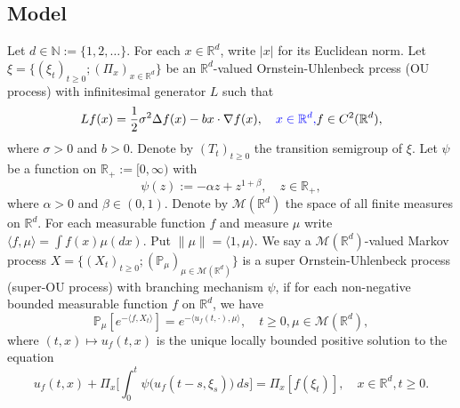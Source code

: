 \documentclass[12pt,oneside,english]{amsart}
\theoremstyle{plain}
\theoremstyle{definition}
\numberwithin{equation}{section}
\newcommand{\added}[1]{{\color{blue}#1}}\newcommand{\deleted}[1]{{\color{red}#1}}
\begin{document}
\subsection{Model}
    Let $d \in \mathbb N:= \{1,2,\dots\}$.
    \deleted{For each $x\in \mathbb{R}^d$, write $|x|$ for its Euclidean norm.}
    Let $\xi=\{(\xi_t)_{t\geq 0}; (\Pi_x)_{x\in \mathbb R^d}\}$ be an $\mathbb R^d$-valued Ornstein-Uhlenbeck prcess (OU process) with infinitesimal generator $L$ such that
\begin{equation}
\label{eq: OU generator}
    Lf(x)
        = \frac{1}{2}\sigma^2\Delta f(x)-b x \cdot \nabla f(x),
        \quad \added{ x\in \mathbb R^d,}
        f \in C^2(\mathbb{R}^d),
\end{equation}
    where $\sigma>0$ and $b>0$.
    Denote by $(T_t)_{t\geq 0}$ the transition semigroup of $\xi$.
    Let $\psi$ be a function on $\mathbb R_+:= [0,\infty)$ with
\begin{equation}\label{mechanism}
    \psi(z)
        := - \alpha z + z^{1+\beta},
        \quad z \in \mathbb R_+,
\end{equation}
        where $\alpha > 0$ and $\beta \in (0,1) $.
    Denote by $\mathcal{M}(\mathbb{R}^d)$ the space of \added{ all} finite measures on $\mathbb{R}^d$.
    For each measurable function $f$ and measure $\mu$ write $\langle f,\mu\rangle = \int f(x)\mu(dx)$.
    Put $\|\mu\|=\langle 1,\mu\rangle$.
    We say a $\mathcal{M}(\mathbb{R}^d)$-valued Markov process $X = \{(X_t)_{t\geq 0}; (\mathbb{P}_{\mu})_{\mu \in \mathcal M(\mathbb R^d)}\}$ is a super Ornstein-Uhlenbeck process (super-OU process) with branching mechanism $\psi$, if for each non-negative bounded measurable function $f$ on $\mathbb{R}^d$, we have
\begin{equation} \label{super}
    \mathbb{P}_{\mu}[e^{-\langle f,X_t \rangle}]
        = e^{-\langle u_f(t,\cdot), \mu \rangle},
        \quad t\geq 0, \mu \in \mathcal M(\mathbb R^d),
\end{equation}
        where $(t,x) \mapsto u_f(t,x)$ is the unique locally bounded positive solution to the equation
\begin{equation}\label{eq1}
        u_f(t,x) + \Pi_x \Big[ \int_0^t\psi\big(u_f(t-s, \xi_s)\big)~ds\Big]
        = \Pi_x [f(\xi_t)],
        \quad x\in \mathbb R^d, t\geq 0.
\end{equation}
\end{document}
